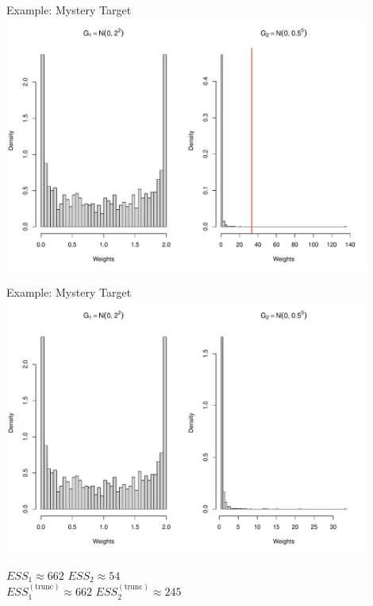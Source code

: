 \documentclass[14pt]{beamer}
\begin{document}
\begin{frame}{Example: Mystery Target}
    \centering
    \includegraphics[height=0.9\textheight, width=0.9\textwidth, keepaspectratio]{Figures/Wt Hist - Thresh.pdf}
\end{frame}


\begin{frame}{Example: Mystery Target}
    \centering
    \includegraphics[height=0.7\textheight, width=0.9\textwidth, keepaspectratio]{Figures/Wt Hist - Trunc.pdf} \newline
    \begin{outline}
        $ESS_1 \approx 662$ \hspace{2.5cm} $ESS_2 \approx 54$\\
        $ESS_1^{(\mathrm{trunc})} \approx 662$ \hspace{2.5cm} $ESS_2^{(\mathrm{trunc})} \approx 245$
    \end{outline}
\end{frame}
\end{document}
